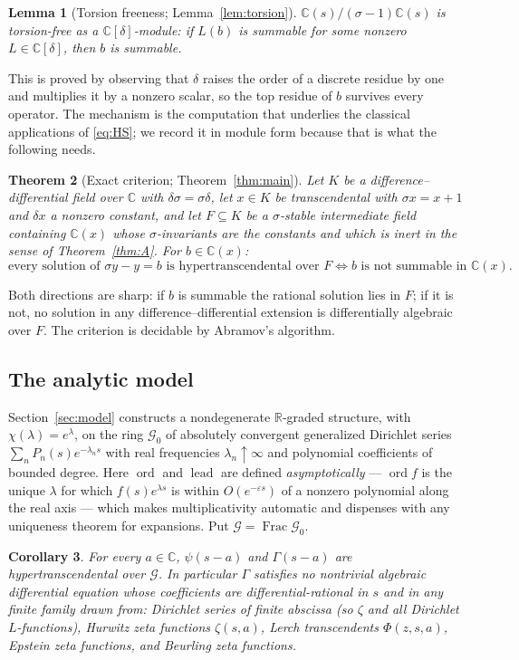 \documentclass[11pt,a4paper]{amsart}
\theoremstyle{plain}
\newtheorem{theorem}{Theorem}[section]
\newtheorem{lemma}[theorem]{Lemma}
\newtheorem{corollary}[theorem]{Corollary}
\theoremstyle{definition}
\newcommand{\CC}{\mathbb{C}}
\newcommand{\RR}{\mathbb{R}}
\newcommand{\sig}{\sigma}
\newcommand{\dd}{\delta}
\newcommand{\ord}{\operatorname{ord}}
\newcommand{\lead}{\operatorname{lead}}
\newcommand{\Frac}{\operatorname{Frac}}
\newcommand{\GG}{\mathcal{G}}
\begin{document}
\begin{lemma}[Torsion freeness; Lemma~\ref{lem:torsion}]\label{lem:C}
$\CC(s)/(\sig-1)\CC(s)$ is torsion-free as a $\CC[\dd]$-module: if $L(b)$ is summable for some
nonzero $L\in\CC[\dd]$, then $b$ is summable.
\end{lemma}

This is proved by observing that $\dd$ raises the order of a discrete residue by one and multiplies
it by a nonzero scalar, so the top residue of $b$ survives every operator. The mechanism is the
computation that underlies the classical applications of \eqref{eq:HS}; we record it in module form
because that is what the following needs.

\begin{theorem}[Exact criterion; Theorem~\ref{thm:main}]\label{thm:B}
Let $K$ be a difference--differential field over $\CC$ with $\dd\sig=\sig\dd$, let $x\in K$ be
transcendental with $\sig x=x+1$ and $\dd x$ a nonzero constant, and let $F\subseteq K$ be a
$\sig$-stable intermediate field containing $\CC(x)$ whose $\sig$-invariants are the constants and
which is inert in the sense of Theorem~\ref{thm:A}. For $b\in\CC(x)$:
\[
  \text{every solution of }\sig y-y=b\text{ is hypertranscendental over }F
  \iff b\text{ is not summable in }\CC(x).
\]
\end{theorem}

Both directions are sharp: if $b$ is summable the rational solution lies in $F$; if it is not, no
solution in any difference--differential extension is differentially algebraic over $F$. The
criterion is decidable by Abramov's algorithm.

\subsection{The analytic model}
Section~\ref{sec:model} constructs a nondegenerate $\RR$-graded structure, with
$\chi(\lambda)=e^{\lambda}$, on the ring $\GG_0$ of absolutely convergent generalized Dirichlet
series $\sum_nP_n(s)e^{-\lambda_ns}$ with real frequencies $\lambda_n\uparrow\infty$ and polynomial
coefficients of bounded degree. Here $\ord$ and $\lead$ are defined \emph{asymptotically} --- $\ord
f$ is the unique $\lambda$ for which $f(s)e^{\lambda s}$ is within $O(e^{-\varepsilon s})$ of a
nonzero polynomial along the real axis --- which makes multiplicativity automatic and dispenses with
any uniqueness theorem for expansions. Put $\GG=\Frac\GG_0$.

\begin{corollary}\label{cor:main}
For every $a\in\CC$, $\psi(s-a)$ and $\Gamma(s-a)$ are hypertranscendental over $\GG$. In particular
$\Gamma$ satisfies no nontrivial algebraic differential equation whose coefficients are
differential-rational in $s$ and in any finite family drawn from: Dirichlet series of finite
abscissa (so $\zeta$ and all Dirichlet $L$-functions), Hurwitz zeta functions $\zeta(s,a)$, Lerch
transcendents $\Phi(z,s,a)$, Epstein zeta functions, and Beurling zeta functions.
\end{corollary}
\end{document}
